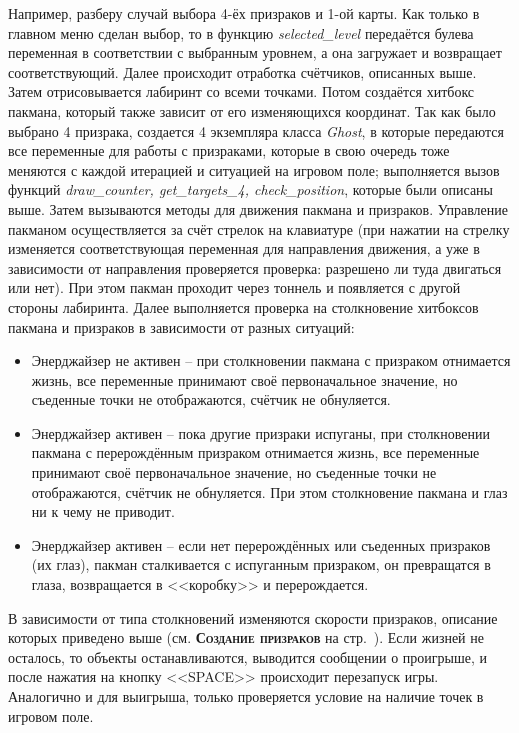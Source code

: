 Например, разберу случай выбора 4-ёх призраков и 1-ой карты. Как только в главном меню сделан выбор, то в функцию \textit{selected\_level} передаётся булева переменная в соответствии с выбранным уровнем, а она загружает и возвращает соответствующий. Далее происходит отработка счётчиков, описанных выше. Затем отрисовывается лабиринт со всеми точками. Потом создаётся хитбокс пакмана, который также зависит от его изменяющихся координат. Так как было выбрано 4 призрака, создается 4 экземпляра класса \textit{Ghost}, в которые передаются все переменные для работы с призраками, которые в свою очередь тоже меняются с каждой итерацией и ситуацией на игровом поле; выполняется вызов функций \textit{draw\_counter, get\_targets\_4, check\_position}, которые были описаны выше. Затем вызываются методы для движения пакмана и призраков. Управление пакманом осуществляется за счёт стрелок на клавиатуре (при нажатии на стрелку изменяется соответствующая переменная для направления движения, а уже в зависимости от направления проверяется проверка: разрешено ли туда двигаться или нет). При этом пакман проходит через тоннель и появляется с другой стороны лабиринта. Далее выполняется проверка на столкновение хитбоксов пакмана и призраков в зависимости от разных ситуаций:
\begin{itemize}
	\item Энерджайзер не активен -- при столкновении пакмана с призраком отнимается жизнь, все переменные принимают своё первоначальное значение, но съеденные точки не отображаются, счётчик не обнуляется.
	\item Энерджайзер активен -- пока другие призраки испуганы, при столкновении пакмана с перерождённым призраком отнимается жизнь, все переменные принимают своё первоначальное значение, но съеденные точки не отображаются, счётчик не обнуляется. При этом столкновение пакмана и глаз ни к чему не приводит.
	\item Энерджайзер активен -- если нет перерождённых или съеденных призраков (их глаз), пакман сталкивается с испуганным призраком, он превращатся в глаза, возвращается в <<коробку>> и перерождается.
\end{itemize}
В зависимости от типа столкновений изменяются скорости призраков, описание которых приведено выше (см. \textbf{\textsc{Создание призраков}} на стр.~\pageref{sec:ch02/sec01/sub06}). Если жизней не осталось, то объекты останавливаются, выводится сообщении о проигрыше, и после нажатия на кнопку <<SPACE>> происходит перезапуск игры. Аналогично и для выигрыша, только проверяется условие на наличие точек в игровом поле.
 

